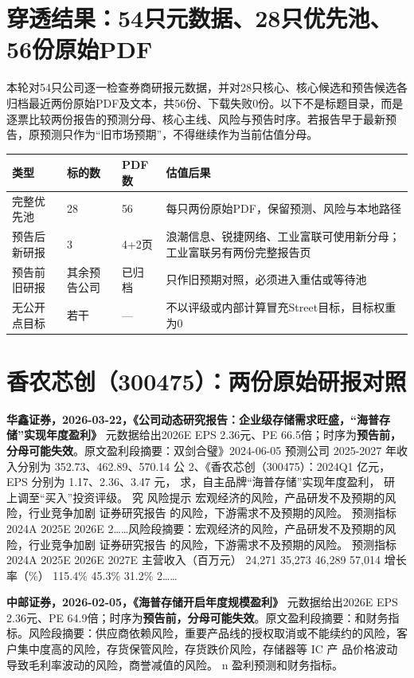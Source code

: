 \section{穿透结果：54只元数据、28只优先池、56份原始PDF}

本轮对54只公司逐一检查券商研报元数据，并对28只核心、核心候选和预告候选各归档最近两份原始PDF及文本，共56份、下载失败0份。以下不是标题目录，而是逐票比较两份报告的预测分母、核心主线、风险与预告时序。若报告早于最新预告，原预测只作为“旧市场预期”，不得继续作为当前估值分母。

\begin{exhibitbox}
\begin{tabularx}{\textwidth}{L{3.2cm}R{2.0cm}R{2.0cm}X}
\toprule
\textbf{类型} & \textbf{标的数} & \textbf{PDF数} & \textbf{估值后果} \\
\midrule
完整优先池 & 28 & 56 & 每只两份原始PDF，保留预测、风险与本地路径 \\
预告后新研报 & 3 & 4+2页 & 浪潮信息、锐捷网络、工业富联可使用新分母；工业富联另有两份完整报告页 \\
预告前旧研报 & 其余预告公司 & 已归档 & 只作旧预期对照，必须进入重估或等待池 \\
无公开点目标 & 若干 & --- & 不以评级或内部计算冒充Street目标，目标权重为0 \\
\bottomrule
\end{tabularx}
\end{exhibitbox}

\section{香农芯创（300475）：两份原始研报对照}

\textbf{华鑫证券，2026-03-22，《公司动态研究报告：企业级存储需求旺盛，“海普存储”实现年度盈利》}
元数据给出2026E EPS 2.36元、PE 66.5倍；时序为\textbf{预告前，分母可能失效}。原文盈利段摘要：双剑合璧》2024-06-05 预测公司 2025-2027 年收入分别为 352.73、462.89、570.14 公 2、《香农芯创（300475）：2024Q1 亿元，EPS 分别为 1.17、2.36、3.47 元， 求，自主品牌“海普存储”实现年度盈利， 研 上调至“买入”投资评级。 究 风险提示 宏观经济的风险，产品研发不及预期的风险，行业竞争加剧 证券研究报告 的风险，下游需求不及预期的风险。 预测指标 2024A 2025E 2026E 2……风险段摘要：宏观经济的风险，产品研发不及预期的风险，行业竞争加剧 证券研究报告 的风险，下游需求不及预期的风险。 预测指标 2024A 2025E 2026E 2027E 主营收入（百万元） 24,271 35,273 46,289 57,014 增长率（\%） 115.4\% 45.3\% 31.2\% 2……

\textbf{中邮证券，2026-02-05，《海普存储开启年度规模盈利》}
元数据给出2026E EPS 2.36元、PE 64.9倍；时序为\textbf{预告前，分母可能失效}。原文盈利段摘要：和财务指标。风险段摘要：供应商依赖风险，重要产品线的授权取消或不能续约的风险，客 户集中度高的风险，存货保管风险，存货跌价风险，存储器等 IC 产 品价格波动导致毛利率波动的风险，商誉减值的风险。 n 盈利预测和财务指标。

